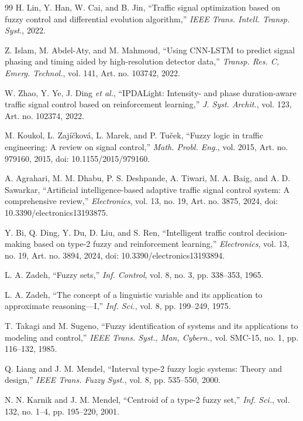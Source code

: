 \begin{thebibliography}{99}
 H. Lin, Y. Han, W. Cai, and B. Jin, ``Traffic signal optimization based on fuzzy control and differential evolution algorithm,'' \emph{IEEE Trans. Intell. Transp. Syst.}, 2022.

 Z. Islam, M. Abdel-Aty, and M. Mahmoud, ``Using CNN-LSTM to predict signal phasing and timing aided by high-resolution detector data,'' \emph{Transp. Res. C, Emerg. Technol.}, vol. 141, Art. no. 103742, 2022.

 W. Zhao, Y. Ye, J. Ding \emph{et al.}, ``IPDALight: Intensity- and phase duration-aware traffic signal control based on reinforcement learning,'' \emph{J. Syst. Archit.}, vol. 123, Art. no. 102374, 2022.

 M. Koukol, L. Zaj{\'i}{\v c}kov{\'a}, L. Marek, and P. Tu{\v c}ek, ``Fuzzy logic in traffic engineering: A review on signal control,'' \emph{Math. Probl. Eng.}, vol. 2015, Art. no. 979160, 2015, doi: 10.1155/2015/979160.

 A. Agrahari, M. M. Dhabu, P. S. Deshpande, A. Tiwari, M. A. Baig, and A. D. Sawarkar, ``Artificial intelligence-based adaptive traffic signal control system: A comprehensive review,'' \emph{Electronics}, vol. 13, no. 19, Art. no. 3875, 2024, doi: 10.3390/electronics13193875.

 Y. Bi, Q. Ding, Y. Du, D. Liu, and S. Ren, ``Intelligent traffic control decision-making based on type-2 fuzzy and reinforcement learning,'' \emph{Electronics}, vol. 13, no. 19, Art. no. 3894, 2024, doi: 10.3390/electronics13193894.

 L. A. Zadeh, ``Fuzzy sets,'' \emph{Inf. Control}, vol. 8, no. 3, pp. 338--353, 1965.

 L. A. Zadeh, ``The concept of a linguistic variable and its application to approximate reasoning---I,'' \emph{Inf. Sci.}, vol. 8, pp. 199--249, 1975.

 T. Takagi and M. Sugeno, ``Fuzzy identification of systems and its applications to modeling and control,'' \emph{IEEE Trans. Syst., Man, Cybern.}, vol. SMC-15, no. 1, pp. 116--132, 1985.

 Q. Liang and J. M. Mendel, ``Interval type-2 fuzzy logic systems: Theory and design,'' \emph{IEEE Trans. Fuzzy Syst.}, vol. 8, pp. 535--550, 2000.

 N. N. Karnik and J. M. Mendel, ``Centroid of a type-2 fuzzy set,'' \emph{Inf. Sci.}, vol. 132, no. 1--4, pp. 195--220, 2001.


\end{thebibliography}
